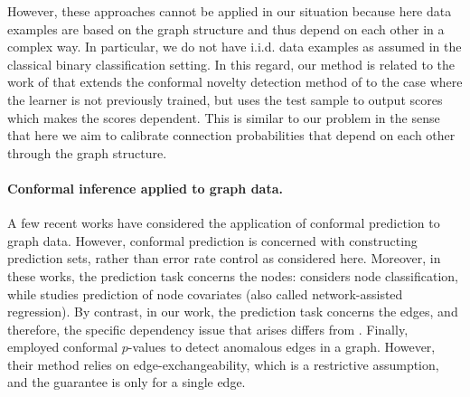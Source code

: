 \documentclass[a4paper, 11pt]{article}
\theoremstyle{remark}
\begin{document}
However, these approaches cannot be applied in our situation because here data examples are based on the graph structure and thus depend on each other in a complex way. In particular, we do not have i.i.d. data examples as assumed in the classical binary classification setting. 
In this regard, our method is related to the work of \cite{marandon22b} that extends the conformal novelty detection method of \cite{bates2023testing} to the case where the learner is not previously trained, but uses the test sample to output scores %
which makes the scores 
dependent. This is similar to our problem in the sense that here we aim to calibrate connection probabilities that depend on each other through the graph structure. 
 
\paragraph{Conformal inference applied to graph data.}
A few recent works \citep{huang2023uncertainty, lunde2023conformal} have considered the application of conformal prediction to graph data. However, conformal prediction is concerned with constructing prediction sets, rather than error rate control as considered here. Moreover, in these works, the prediction task concerns the nodes: \cite{huang2023uncertainty} considers node classification, while \cite{lunde2023conformal} studies prediction of node covariates (also called network-assisted regression). By contrast, in our work, the prediction task concerns the edges, and therefore, the specific dependency issue that arises differs from \cite{huang2023uncertainty, lunde2023conformal}. 
Finally, \cite{luo2021anomalous} employed conformal $p$-values to detect anomalous edges in a graph. However, their method relies on edge-exchangeability, which is a restrictive assumption, and the guarantee is only for a single edge. 
\end{document}
